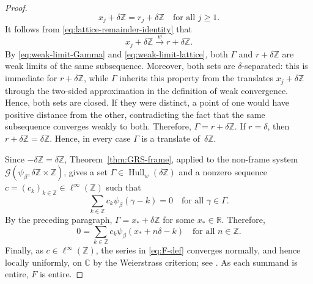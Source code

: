 \documentclass[11pt]{amsart}
\numberwithin{equation}{section}
\theoremstyle{definition}
\theoremstyle{remark}
\newcommand{\R}{\mathbb R}
\newcommand{\C}{\mathbb C}
\newcommand{\Z}{\mathbb Z}
\newcommand{\cG}{\mathcal G}
\newcommand{\Hullw}{\operatorname{Hull}_{w}}
\begin{document}
\begin{proof}
        \begin{equation}\label{eq:lattice-remainder-identity}
            x_j+\delta\Z=r_j+\delta\Z
            \quad\text{for all }j\geq1.
        \end{equation}
        It follows from \eqref{eq:lattice-remainder-identity} that
        \begin{equation}\label{eq:weak-limit-lattice}
            x_j+\delta\Z \xrightarrow{w} r+\delta\Z. 
        \end{equation}
        By \eqref{eq:weak-limit-Gamma} and \eqref{eq:weak-limit-lattice}, both $\Gamma$ and $r+\delta\Z$ are weak limits of the same subsequence. Moreover, both sets are $\delta$-separated: this is immediate for $r+\delta\Z$, while $\Gamma$ inherits this property from the translates $x_j+\delta\Z$ through the two-sided approximation in the definition of weak convergence. Hence, both sets are closed. If they were distinct, a point of one would have positive distance from the other, contradicting the fact that the same subsequence converges weakly to both. Therefore, $\Gamma=r+\delta\Z$. If $r=\delta$, then $r+\delta\Z=\delta\Z$. Hence, in every case $\Gamma$ is a translate of~$\delta\Z$.

        Since $-\delta\Z=\delta\Z$, Theorem~\ref{thm:GRS-frame}, applied to the non-frame system $\cG(\psi_\beta,\delta\Z\times\Z)$, gives a set $\Gamma\in\Hullw(\delta\Z)$ and a nonzero sequence
        $c=(c_k)_{k\in\Z}\in\ell^\infty(\Z)$ such that
        \begin{equation}\label{eq:annihilating-sequence}
            \sum_{k\in\Z}c_k \psi_\beta(\gamma-k)=0
            \quad\text{for all }\gamma\in\Gamma.
        \end{equation} 
        By the preceding paragraph, $\Gamma=x_*+\delta\Z$ for some $x_*\in\R$. Therefore,
        \begin{equation}\label{eq:annihilation-grid}
            0=\sum_{k\in\Z}c_k \psi_\beta(x_*+n\delta-k)
            \quad\text{for all }n\in\Z.
        \end{equation} 
        Finally, as $c\in\ell^\infty(\Z)$, the series in \eqref{eq:F-def} converges normally, and hence locally uniformly, on $\C$ by the Weierstrass criterion; see \cite[pp.~104--107]{Remmert}. As each summand is entire, $F$ is entire.


\end{proof}
\end{document}
